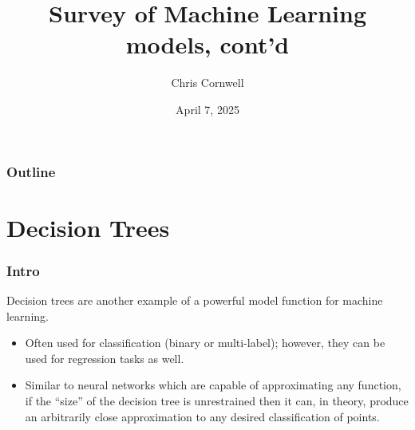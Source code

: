 \documentclass[smaller]{beamer}
\author{Chris Cornwell}
\date{April 7, 2025}
\title{Survey of Machine Learning models, cont'd}
\theoremstyle{example}
\begin{document}
\begin{frame}
\titlepage
\end{frame}

\begin{frame}
    \frametitle{Outline}
    \tableofcontents
\end{frame}

\section{Decision Trees}

\begin{frame}
\frametitle{Intro}
Decision trees are another example of a powerful model function for machine learning. 
\begin{itemize}
    \item Often used for classification (binary or multi-label); however, they can be used for regression tasks as well. 
    \item Similar to neural networks which are capable of approximating any function, if the ``size'' of the decision tree is unrestrained then it can, in theory, produce an arbitrarily close approximation to any desired classification of points.
\end{itemize}

\end{frame}
\end{document}
